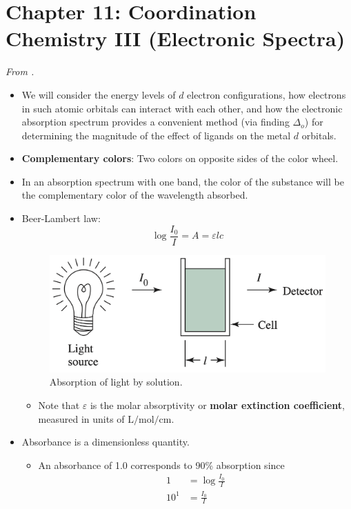 \documentclass[../notes.tex]{subfiles}
\begin{document}
\section{Chapter 11: Coordination Chemistry III (Electronic Spectra)}
\emph{From \textcite{bib:MiesslerFischerTarr}.}
\begin{itemize}
    \item {}We will consider the energy levels of $d$ electron configurations, how electrons in such atomic orbitals can interact with each other, and how the electronic absorption spectrum provides a convenient method (via finding $\Delta_o$) for determining the magnitude of the effect of ligands on the metal $d$ orbitals.
    \item \textbf{Complementary colors}: Two colors on opposite sides of the color wheel.
    \item In an absorption spectrum with one band, the color of the substance will be the complementary color of the wavelength absorbed.
    \item Beer-Lambert law:
    \begin{equation*}
        \log\frac{I_0}{I} = A = \varepsilon lc
    \end{equation*}
    \begin{figure}[h!]
        \centering
        \includegraphics[width=0.4\linewidth]{../ExtFiles/absorption.png}
        \caption{Absorption of light by solution.}
        \label{fig:absorption}
    \end{figure}
    \begin{itemize}
        \item Note that $\varepsilon$ is the molar absorptivity or \textbf{molar extinction coefficient}, measured in units of $\si{\liter\per\mole\per\centi\meter}$.
    \end{itemize}
    \item Absorbance is a dimensionless quantity.
    \begin{itemize}
        \item An absorbance of 1.0 corresponds to 90\% absorption since
        \begin{align*}
            1 &= \log\frac{I_0}{I}\\
            10^1 &= \frac{I_0}{I}\\

\end{align*}
\end{itemize}
\end{itemize}
\end{document}
